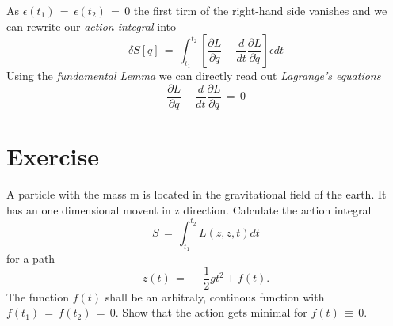 \documentclass{report}
\begin{document}
As $\epsilon(t_1) \,=\, \epsilon(t_2) \,=\, 0$ the first tirm of the right-hand
side vanishes and we can rewrite our \textit{action integral} into
\begin{equation}
  \delta S[q] \,=\, \int_{t_1}^{t_2} \left[\frac{\partial L}{\partial q} -
\frac{d}{dt} \frac{\partial L}{\partial \dot q}\right]\epsilon dt  
\end{equation}
Using the \textit{fundamental Lemma} we can directly read out
\textit{Lagrange's equations}
\begin{equation}
  \frac{\partial L}{\partial q} - \frac{d}{dt} \frac{\partial L}{\partial \dot
q }\,=\, 0
\end{equation}


\section{Exercise}
A particle with the mass m is located in the gravitational field of the earth.
It has an one dimensional movent in z direction. Calculate the action integral
\begin{equation}
  S \,=\, \int_{t_1}^{t_2} L(z, \dot z, t) dt
\end{equation}
for a path 
\begin{equation}
  z(t) \,=\, - \frac{1}{2} gt^2 + f(t).
\end{equation}
The function $f(t)$ shall be an arbitraly, continous function with $f(t_1)
\,=\, f(t_2) \,=\, 0$. Show that the action gets minimal for $f(t) \,\equiv\, 0$.
\end{document}
